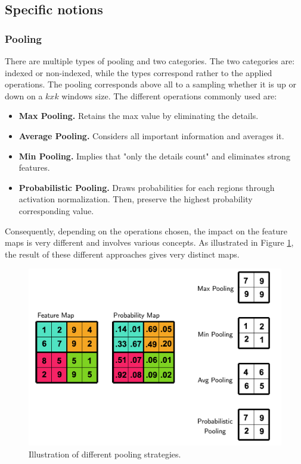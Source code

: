 \subsection{Specific notions}\label{specnot}

\subsubsection{Pooling}
There are multiple types of pooling and two categories. The two categories are: indexed or non-indexed, while the types correspond rather to the applied operations.
The pooling corresponds above all to a sampling whether it is up or down on a $kxk$ windows size. The different operations commonly used are:
\begin{itemize}
	\item \textbf{Max Pooling. } Retains the max value by eliminating the details.
	\item \textbf{Average Pooling. } Considers all important information and averages it.
	
	\item \textbf{Min Pooling. } Implies that "only the details count" and eliminates strong features.
	
	\item \textbf{Probabilistic Pooling. }Draws probabilities for each regions through activation normalization. Then, preserve the highest probability corresponding value.
\end{itemize}

Consequently, depending on the operations chosen, the impact on the feature maps is very different and involves various concepts. As illustrated in Figure \ref{fig:pooling}, the result of these different approaches gives very distinct maps.

\begin{figure}[h]
	\centering
	\includegraphics[width=0.8\linewidth]{Figures/Preliminary/pooling}
	\caption{Illustration of different pooling strategies.}
	\label{fig:pooling}
\end{figure}



